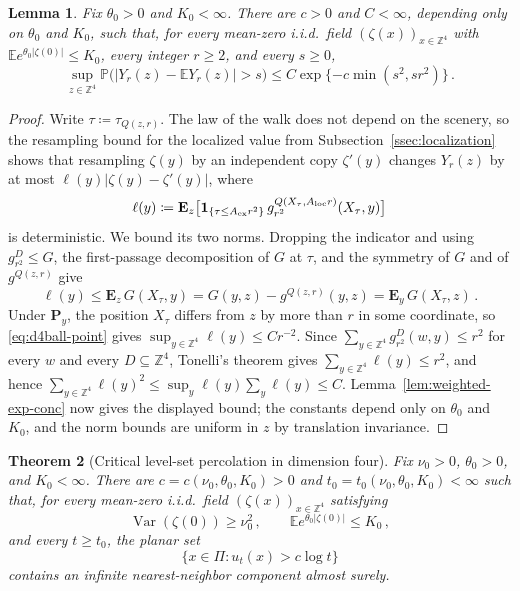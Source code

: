 \documentclass[11pt]{amsart}
\theoremstyle{plain}
\newtheorem{theorem}{Theorem}[section]
\newtheorem{lemma}[theorem]{Lemma}
\theoremstyle{definition}
\newcommand{\Z}{\mathbb{Z}}
\newcommand{\E}{\mathbb{E}}
\renewcommand{\P}{\mathbb{P}}
\DeclareMathOperator{\Var}{Var}
\newcommand{\one}{\mathbf{1}}
\begin{document}
\begin{lemma}\label{lem:d4-exit-average-concentration}
Fix $\theta_{0}>0$ and $K_{0}<\infty$. There are $c>0$ and $C<\infty$, depending
only on $\theta_{0}$ and $K_{0}$, such that, for every mean-zero i.i.d.\ field
$(\zeta(x))_{x\in\Z^4}$ with $\E e^{\theta_{0}|\zeta(0)|}\leq K_{0}$, every integer
$r\geq2$, and every $s\geq0$,
\[
    \sup_{z\in\Z^4}
    \P\bigl(|Y_r(z)-\E Y_r(z)|>s\bigr)
    \leq
    C\exp\{-c\min(s^2,sr^2)\}\, .
\]
\end{lemma}
\begin{proof}
Write $\tau\coloneqq\tau_{Q(z,r)}$. The law of the walk does not depend on the
scenery, so the resampling bound for the localized value from
Subsection~\ref{ssec:localization} shows that resampling $\zeta(y)$ by an
independent copy $\zeta'(y)$ changes $Y_r(z)$ by at most
$\ell(y)|\zeta(y)-\zeta'(y)|$, where
\[
    \ell(y)\coloneqq
    \mathbf E_z\bigl[
    \one_{\{\tau\leq A_{\rm ex}r^2\}}\,
    g_{r^2}^{Q(X_\tau,A_{\rm loc}r)}(X_\tau,y)
    \bigr]
\]
is deterministic. We bound its two norms. Dropping the indicator and using
$g_{r^2}^{D}\leq G$, the first-passage decomposition of $G$ at $\tau$, and the
symmetry of $G$ and of $g^{Q(z,r)}$ give
\[
    \ell(y)
    \leq
    \mathbf E_z\,G(X_\tau,y)
    =
    G(y,z)-g^{Q(z,r)}(y,z)
    =
    \mathbf E_y\,G(X_\tau,z)\, .
\]
Under $\mathbf P_y$, the position $X_\tau$ differs from $z$ by more than $r$ in
some coordinate, so \eqref{eq:d4ball-point} gives
$\sup_{y\in\Z^4}\ell(y)\leq Cr^{-2}$. Since
$\sum_{y\in\Z^4}g_{r^2}^{D}(w,y)\leq r^2$ for every $w$ and every
$D\subseteq\Z^4$, Tonelli's theorem gives
$\sum_{y\in\Z^4}\ell(y)\leq r^2$, and hence
$\sum_{y\in\Z^4}\ell(y)^2\leq\sup_{y}\ell(y)\sum_{y}\ell(y)\leq C$.
Lemma~\ref{lem:weighted-exp-conc} now gives the displayed bound; the constants
depend only on $\theta_{0}$ and $K_{0}$, and the norm bounds are uniform in $z$ by
translation invariance.
\end{proof}

\begin{theorem}[Critical level-set percolation in dimension four]
\label{thm:d4-critical-level-percolation}
Fix $\nu_{0}>0$, $\theta_{0}>0$, and $K_{0}<\infty$. There are
$c=c(\nu_{0},\theta_{0},K_{0})>0$ and
$t_0=t_0(\nu_{0},\theta_{0},K_{0})<\infty$ such that, for every mean-zero i.i.d.\
field $(\zeta(x))_{x\in\Z^4}$ satisfying
\[
    \Var(\zeta(0))\geq\nu_{0}^2\, ,
    \qquad
    \E e^{\theta_{0}|\zeta(0)|}\leq K_{0}\, ,
\]
and every $t\geq t_0$, the planar set
\[
    \{x\in\Pi:u_t(x)>c\log t\}
\]
contains an infinite nearest-neighbor component almost surely. 
\end{theorem}
\end{document}
